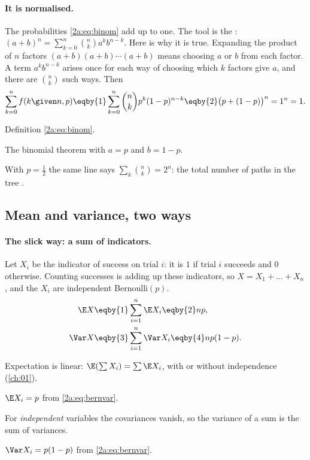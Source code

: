 \paragraph{It is normalised.} The probabilities \eqref{2a:eq:binom} add up to one. The tool is the : $(a+b)^n=\sum_{k=0}^n\binom nk a^kb^{n-k}$. Here is why it is true. Expanding the product of $n$ factors $(a+b)(a+b)\cdots(a+b)$ means choosing $a$ or $b$ from each factor. A term $a^kb^{n-k}$ arises once for each way of choosing which $k$ factors give $a$, and there are $\binom nk$ such ways. Then
\begin{align*}
  \sum_{k=0}^n f(k\given n,p) \eqby{1} \sum_{k=0}^n\binom nk p^k(1-p)^{n-k} \eqby{2} \bigl(p+(1-p)\bigr)^n = 1^n = 1 .
\end{align*}
\begin{explain}
  \item Definition \eqref{2a:eq:binom}.
  \item The binomial theorem with $a=p$ and $b=1-p$.
\end{explain}
With $p=\tfrac12$ the same line says $\sum_k\binom nk=2^n$: the total number of paths in the tree .

\subsection{Mean and variance, two ways}

\paragraph{The slick way: a sum of indicators.} Let $X_i$ be the indicator of success on trial $i$: it is $1$ if trial $i$ succeeds and $0$ otherwise. Counting successes is adding up these indicators, so $X=X_1+\dots+X_n$, and the $X_i$ are independent Bernoulli$(p)$.
\begin{align}
  \E X &\eqby{1} \sum_{i=1}^n\E X_i \eqby{2} np, \nonumber\\
  \Var X &\eqby{3} \sum_{i=1}^n\Var X_i \eqby{4} np(1-p). \label{2a:eq:binvar}
\end{align}
\begin{explain}
  \item Expectation is linear: $\E(\sum X_i)=\sum\E X_i$, with or without independence (\cref{ch:01}).
  \item $\E X_i=p$ from \eqref{2a:eq:bernvar}.
  \item For \emph{independent} variables the covariances vanish, so the variance of a sum is the sum of variances.
  \item $\Var X_i=p(1-p)$ from \eqref{2a:eq:bernvar}.
\end{explain}


